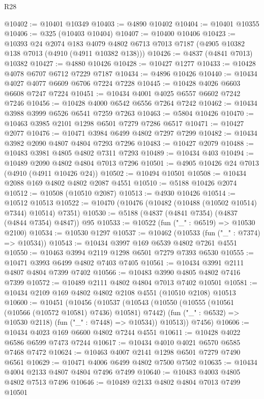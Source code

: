 \begin{lexlean}{R28}
\begin{coremodule}
@10402 := @10401 @10349
@10403 := @4890 @10402
@10404 := @10401 @10355
@10406 := @325 (@10403 @10404)
@10407 := @10400 @10406
@10423 := @10393
    @24
    @2074
    @183
    @4079
    @4802
    @6713
    @7013
    @7187
    (@4905 @10382 @138 @7013 (@4910 (@4911 @10382 @138)))
@10426 := @4837 (@4841 @7013) @10382
@10427 := @4880 @10426
@10428 := @10427 @1277
@10433 := @10428 @4078 @6707 @6712 @7229 @7187
@10434 := @4896 @10426
@10440 := @10434 @4027 @4077 @6609 @6706 @7224 @7228
@10445 := @10428 @4026 @6603 @6608 @7247 @7224
@10451 := @10434 @4001 @4025 @6557 @6602 @7242 @7246
@10456 := @10428 @4000 @6542 @6556 @7264 @7242
@10462 := @10434 @3988 @3999 @6526 @6541 @7259 @7263
@10463 := @5804 @10426
@10470 := @10463 @3985 @2101 @1298 @6501 @7279 @7286 @6517
@10471 := @10427 @2077
@10476 := @10471 @3984 @6499 @4802 @7297 @7299
@10482 := @10434 @3982 @2090 @4807 @4804 @7293 @7296
@10483 := @10427 @2079
@10488 := @10483 @3981 @4805 @4802 @7311 @7293
@10489 := @10434 @403
@10494 := @10489 @2090 @4802 @4804 @7013 @7296
@10501 := @4905 @10426 @24 @7013 (@4910 (@4911 @10426 @24))
@10502 := @10494 @10501
@10508 := @10434 @2088 @169 @4802 @4802 @2087 @4551
@10510 := @5188 @10426 @2074
@10512 := @10508 (@10510 @2087)
@10513 := @4930 @10426
@10514 := @10512 @10513
@10522 := @10470 (@10476 (@10482 (@10488 (@10502 @10514) @7344) @10514) @7351)
@10530 := @5188 (@4837 (@4841 @7354) (@4837 (@4844 @7354) @4847)) @95
@10533 := @10522 (fun ("_" : @6519) => @10530 @2100)
@10534 := @10530 @1297
@10537 := @10462 (@10533 (fun ("_" : @7374) => @10534))
@10543 := @10434 @3997 @169 @6539 @4802 @7261 @4551
@10550 := @10463 @3994 @2119 @1298 @6501 @7279 @7393 @6530
@10555 := @10471 @3993 @6499 @4802 @7403 @7405
@10561 := @10434 @3991 @2111 @4807 @4804 @7399 @7402
@10566 := @10483 @3990 @4805 @4802 @7416 @7399
@10572 := @10489 @2111 @4802 @4804 @7013 @7402 @10501
@10581 := @10434 @2109 @169 @4802 @4802 @2108 @4551 (@10510 @2108) @10513
@10600 := @10451
    (@10456
      (@10537
        (@10543
          (@10550
            (@10555 (@10561 (@10566 (@10572 @10581) @7436) @10581) @7442)
            (fun ("_" : @6532) => @10530 @2118)
            (fun ("_" : @7448) => @10534))
          @10513))
      @7456)
@10606 := @10434 @4023 @169 @6600 @4802 @7244 @4551
@10611 := @10428 @4022 @6586 @6599 @7473 @7244
@10617 := @10434 @4010 @4021 @6570 @6585 @7468 @7472
@10624 := @10463 @4007 @2141 @1298 @6501 @7279 @7490 @6561
@10629 := @10471 @4006 @6499 @4802 @7500 @7502
@10635 := @10434 @4004 @2133 @4807 @4804 @7496 @7499
@10640 := @10483 @4003 @4805 @4802 @7513 @7496
@10646 := @10489 @2133 @4802 @4804 @7013 @7499 @10501

\end{coremodule}
\end{lexlean}
